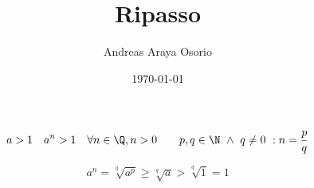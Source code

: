 \documentclass[12pt, a4paper]{article}
\title{Ripasso}
\author{Andreas Araya Osorio}
\date{\today}
\begin{document}
\maketitle

\begin{equation}
	a>1 \quad a^n>1 \quad \forall n \in \Q, n>0 \qquad
	p,q \in \N\ \land\ q \neq 0\ : n=\frac{p}{q}
\end{equation}

\begin{equation}
	a^n = \sqrt[q]{a^p} \geq \sqrt[q]{a} > \sqrt[q]{1} = 1
\end{equation}
\end{document}
